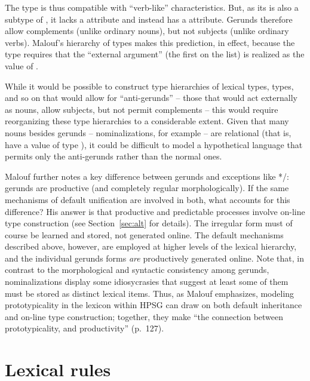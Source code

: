 \documentclass[output=paper
	        ,collection
	        ,collectionchapter
 	        ,biblatex
                ,babelshorthands
                ,newtxmath
                ,draftmode
                ,colorlinks, citecolor=brown
]{langscibook}
\begin{document}
The type  is thus compatible with ``verb-like'' characteristics.
But, as its  is also a subtype of , it lacks a  attribute and instead has a  attribute.
Gerunds therefore allow complements (unlike ordinary nouns), but not subjects (unlike ordinary verbs).
Malouf's hierarchy of types makes this prediction, in effect, because the  type requires that the ``external argument'' (the first on the  list) is realized as the value of .

While it would be possible to construct type hierarchies of lexical types,  types, and so on that would allow for ``anti-gerunds'' -- those that would act externally as nouns, allow subjects, but not permit complements -- this would require reorganizing these type hierarchies to a considerable extent.
Given that many nouns besides gerunds -- nominalizations, for example -- are relational (that is, have a  value of type ), it could be difficult to model a hypothetical language that permits only the anti-gerunds rather than the normal ones.

Malouf further notes a key difference between gerunds and exceptions like */:  gerunds are productive (and completely regular morphologically).
If the same mechanisms of default unification are involved in both, what accounts for this difference?
His answer is that productive and predictable processes involve on-line type construction (see Section~\ref{sec:alt} for details).
The irregular form  must of course be learned and stored, not generated online.
The default mechanisms described above, however, are employed at higher levels of the lexical hierarchy, and the individual gerunds forms \emph{are} productively generated online.
Note that, in contrast to the morphological and syntactic consistency among gerunds,  nominalizations display some idiosycrasies that suggest at least some of them must be stored as distinct lexical items.
Thus, as Malouf emphasizes, modeling prototypicality in the lexicon within HPSG can draw on both default inheritance and on-line type construction; together, they make ``the connection between prototypicality, and productivity'' (p.\ 127).

\section{Lexical rules}
\label{lexicon-sec-lexical-rules}
\end{document}
